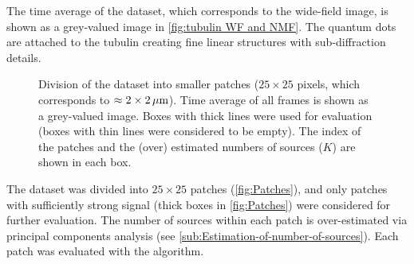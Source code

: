 The time average of the dataset, which corresponds to the wide-field image, is shown as a grey-valued image in \autoref{fig:tubulin WF and NMF}\aaa. The quantum dots are attached to the tubulin creating fine linear structures with sub-diffraction details. 

\begin{figure}[!htb]
	\centering
	\caption{Division of the dataset into smaller patches ($25\times25$ pixels, which corresponds to $\approx 2\times2 \, \mathrm{\mu m}$). Time average of all frames is shown as a grey-valued image. Boxes with thick lines were used for \inmf{} evaluation (boxes with thin lines were considered to be empty). The index of the patches and the (over) estimated numbers of sources ($K$) are shown in each box.}
	\label{fig:Patches}
\end{figure}
%
The dataset was divided into $25 \times 25$ patches (\autoref{fig:Patches}), and only patches with sufficiently strong signal (thick boxes in \autoref{fig:Patches}) were considered for further evaluation. The number of sources within each patch is over-estimated via principal components analysis (see \autoref{sub:Estimation-of-number-of-sources}). Each patch was evaluated with the \inmf{} algorithm.

